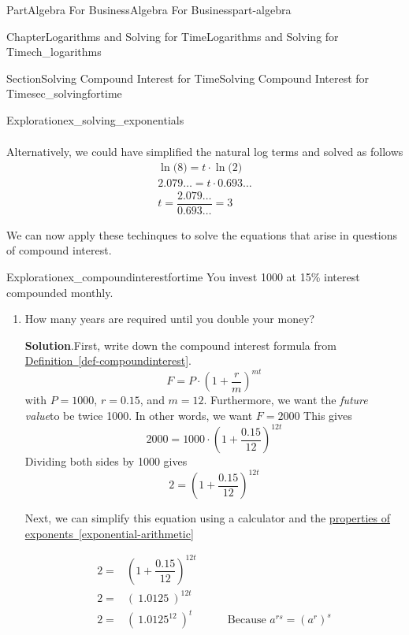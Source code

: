 \documentclass{tufte-book}
\newcommand{\blocktitlefont}{\relax}
\newcommand{\xreffont}{\relax}
\numberwithin{equation}{chapter}
\newcommand{\amp}{&}
\begin{document}
\begin{partptx}{Part}{Algebra For Business}{}{Algebra For Business}{}{}{part-algebra}
\begin{chapterptx}{Chapter}{Logarithms and Solving for Time}{}{Logarithms and Solving for Time}{}{}{ch_logarithms}
\begin{sectionptx}{Section}{Solving Compound Interest for Time}{}{Solving Compound Interest for Time}{}{}{sec_solvingfortime}
\begin{exploration}{Exploration}{}{ex_solving_exponentials}
\begin{enumerate}[font=\bfseries,label=(\alph*),ref=\alph*]
\begin{align*}
\end{align*}
Alternatively, we could have simplified the natural log terms and solved as follows%
\begin{gather*}
\ln\Big(8\Big) = t\cdot \ln\Big(2\Big) \\
2.079{\dots}= t\cdot {0.693\dots} \\
t =  \dfrac{2.079{\dots}}{0.693\dots} = 3
\end{gather*}
%
\end{enumerate}%
\end{exploration}%
We can now apply these techinques to solve the equations that arise in questions of compound interest.%
\begin{exploration}{Exploration}{}{ex_compoundinterestfortime}%
You invest \textdollar{}1000 at 15\% interest compounded monthly.%
\begin{enumerate}[font=\bfseries,label=(\alph*),ref=\alph*]%
\item{}How many years are required until you double your money?%
\par\smallskip%
\noindent\textbf{\blocktitlefont Solution}.\hypertarget{ex_compoundinterestfortime-2-2}{}\quad{}First, write down the compound interest formula from  \hyperref[def-compoundinterest]{Definition~{\xreffont\ref{def-compoundinterest}}}.%
\begin{equation*}
F = P\cdot \left(1 + \frac{r}{m}\right)^{mt}
\end{equation*}
with \(P=1000\), \(r=0.15\), and \(m=12\). Furthermore, we want the \emph{future value}to be twice 1000.  In other words, we want \(F=2000\) This gives%
\begin{equation*}
2000 = 1000 \cdot \left(1 + \dfrac{0.15}{12}\right)^{12t}
\end{equation*}
Dividing both sides by 1000 gives%
\begin{equation*}
2 = \left(1 + \dfrac{0.15}{12}\right)^{12t}
\end{equation*}
%
\par
Next, we can simplify this equation using a calculator and the \hyperref[exponential-arithmetic]{properties of exponents~{\xreffont\ref{exponential-arithmetic}}}%
\par
%
\begin{align*}
2 = \amp \left(1 + \dfrac{0.15}{12}\right)^{12t} \amp \\
2 = \amp \left(\ 1.0125\ \right)^{12t} \amp \\
2 = \amp \left(\ 1.0125^{12}\ \right)^{t} \amp \qquad\text{Because } a^{rs}=(a^r)^s\\

\end{align*}
\end{enumerate}
\end{exploration}
\end{sectionptx}
\end{chapterptx}
\end{partptx}
\end{document}

